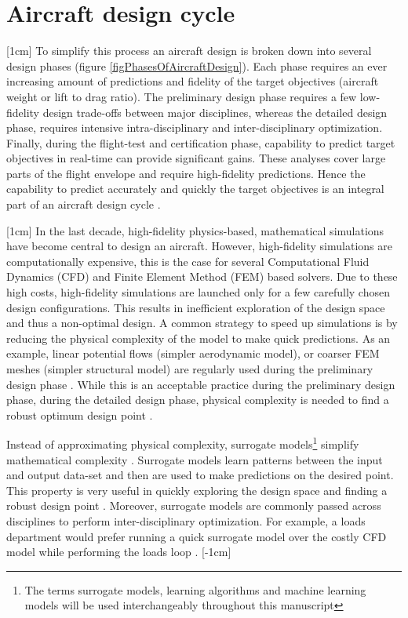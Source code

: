 \section{Aircraft design cycle}\label{secSircraftDesignCycle}
[1cm]
To simplify this process an aircraft design is broken down into several design phases (figure \ref{figPhasesOfAircraftDesign}). Each phase requires an ever increasing amount of predictions and fidelity of the target objectives (aircraft weight or lift to drag ratio). The preliminary design phase requires a few low-fidelity design trade-offs between major disciplines, whereas the detailed design phase, requires intensive intra-disciplinary and inter-disciplinary optimization. Finally, during the flight-test and certification phase, capability to predict target objectives in real-time can provide significant gains. These analyses cover large parts of the flight envelope and require high-fidelity predictions. Hence the capability to predict accurately and quickly the target objectives is an integral part of an aircraft design cycle \cite{raymer2012aircraft}. 

[1cm]
In the last decade, high-fidelity physics-based, mathematical simulations have become central to design an aircraft. However, high-fidelity simulations are computationally expensive, this is the case for several Computational Fluid Dynamics (CFD) and Finite Element Method (FEM) based solvers. Due to these high costs, high-fidelity simulations are launched only for a few carefully chosen design configurations. This results in inefficient exploration of the design space and thus a non-optimal design. A common strategy to speed up simulations is by reducing the physical complexity of the model to make quick predictions. As an example, linear potential flows (simpler aerodynamic model), or coarser FEM meshes (simpler structural model) are regularly used during the preliminary design phase \cite{cummings2015applied}. While this is an acceptable practice during the preliminary design phase, during the detailed design phase, physical complexity is needed to find a robust optimum design point \cite{raymer2012aircraft}.


Instead of approximating physical complexity, surrogate models\footnote{The terms surrogate models, learning algorithms and machine learning models will be used interchangeably throughout this manuscript} simplify mathematical complexity \cite{verveld2016reduced}. Surrogate models learn patterns between the input and output data-set and then are used to make predictions on the desired point. This property is very useful in quickly exploring the design space and finding a robust design point \cite{forrester2008engineering}. Moreover, surrogate models are commonly passed across disciplines to perform inter-disciplinary optimization. For example, a loads department would prefer running a quick surrogate model over the costly CFD model while performing the loads loop \cite{bartoliAIAA2017, bartoliAGILE2017}.  
[-1cm]


